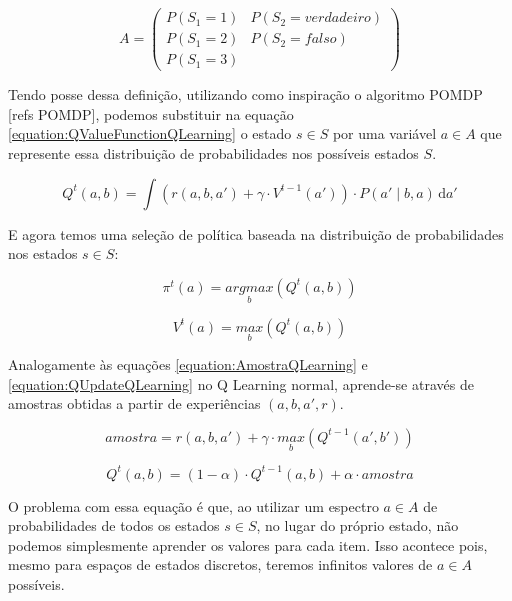 $$
	A = \left(
	\begin{matrix}
		P \left( S_1 = 1 \right) & P \left( S_2 = verdadeiro \right) \\
		P \left( S_1 = 2 \right) & P \left( S_2 = falso \right) \\
		P \left( S_1 = 3 \right) &  
	\end{matrix} \right)
$$

Tendo posse dessa definição, utilizando como inspiração o algoritmo POMDP [refs POMDP], podemos substituir na equação \ref{equation:QValueFunctionQLearning} o estado $ s \in S $ por uma variável $ a \in A $ que represente essa distribuição de probabilidades nos possíveis estados $ S $.

\begin{equation} \label{equation:QValueFunctionPartiallyObservable}
    Q^t \left( a, b \right) = \int \! \left( r \left( a, b, a' \right) + \gamma \cdot V^{t-1} \left( a' \right) \right) \cdot P \left( a' \mid b, a \right) \, \mathrm{d}a'
\end{equation}

E agora temos uma seleção de política baseada na distribuição de probabilidades nos estados $ s \in S $:

\begin{equation} \label{equation:PolicySelectionPartiallyObservable}
    \pi^t \left( a \right) = \underset{b}{argmax} \left( Q^t \left( a, b \right) \right)
\end{equation}

\begin{equation}
    V^t \left( a \right) = \underset{b}{max} \left( Q^t \left( a, b \right) \right)
\end{equation}


Analogamente às equações \ref{equation:AmostraQLearning} e \ref{equation:QUpdateQLearning} no Q Learning normal, aprende-se através de amostras obtidas a partir de experiências $ \left( a, b, a', r \right) $.


\begin{equation}
	amostra = r \left( a, b, a' \right) + \gamma \cdot \underset{b}{max} \left( Q^{t-1} \left( a', b' \right) \right)
\end{equation}

\begin{equation}
	Q^t \left( a, b \right) = \left( 1 - \alpha \right) \cdot Q^{t-1} \left( a, b \right) + \alpha \cdot amostra
\end{equation}

O problema com essa equação é que, ao utilizar um espectro $ a \in A $ de probabilidades de todos os estados $ s \in S $, no lugar do próprio estado, não podemos simplesmente aprender os valores para cada item. Isso acontece pois, mesmo para espaços de estados discretos, teremos infinitos valores de $ a \in A $ possíveis.

